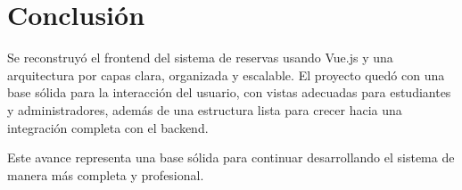 \documentclass[12pt]{article}
\begin{document}
\section{Conclusión}

Se reconstruyó el frontend del sistema de reservas usando Vue.js y una arquitectura por capas clara, organizada y escalable. El proyecto quedó con una base sólida para la interacción del usuario, con vistas adecuadas para estudiantes y administradores, además de una estructura lista para crecer hacia una integración completa con el backend.

Este avance representa una base sólida para continuar desarrollando el sistema de manera más completa y profesional.
\end{document}
